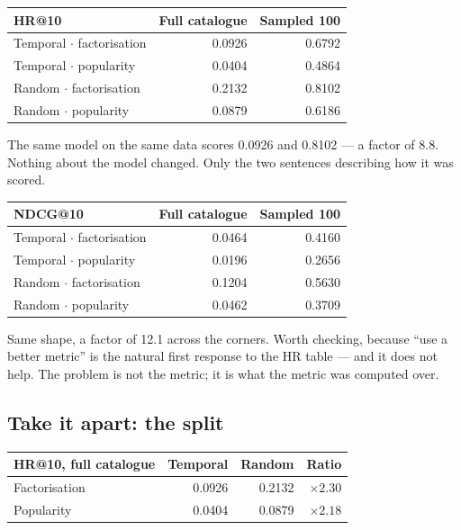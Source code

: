 \documentclass[11pt,a4paper]{article}
\begin{document}
\begin{center}
\small
\begin{tabular}{lrr}
\toprule
\textbf{HR@10} & \textbf{Full catalogue} & \textbf{Sampled 100} \\
\midrule
Temporal $\cdot$ factorisation & 0.0926 & 0.6792 \\
Temporal $\cdot$ popularity    & 0.0404 & 0.4864 \\
Random $\cdot$ factorisation   & 0.2132 & 0.8102 \\
Random $\cdot$ popularity      & 0.0879 & 0.6186 \\
\bottomrule
\end{tabular}
\end{center}

The same model on the same data scores 0.0926 and 0.8102 --- a factor of 8.8.
Nothing about the model changed. Only the two sentences describing how it was
scored.

\begin{center}
\small
\begin{tabular}{lrr}
\toprule
\textbf{NDCG@10} & \textbf{Full catalogue} & \textbf{Sampled 100} \\
\midrule
Temporal $\cdot$ factorisation & 0.0464 & 0.4160 \\
Temporal $\cdot$ popularity    & 0.0196 & 0.2656 \\
Random $\cdot$ factorisation   & 0.1204 & 0.5630 \\
Random $\cdot$ popularity      & 0.0462 & 0.3709 \\
\bottomrule
\end{tabular}
\end{center}

Same shape, a factor of 12.1 across the corners. Worth checking, because ``use
a better metric'' is the natural first response to the HR table --- and it does
not help. The problem is not the metric; it is what the metric was computed
over.

\subsection{Take it apart: the split}

\begin{center}
\small
\begin{tabular}{lrrr}
\toprule
\textbf{HR@10, full catalogue} & \textbf{Temporal} & \textbf{Random} &
\textbf{Ratio} \\
\midrule
Factorisation & 0.0926 & 0.2132 & $\times 2.30$ \\
Popularity    & 0.0404 & 0.0879 & $\times 2.18$ \\
\bottomrule
\end{tabular}
\end{center}
\end{document}
